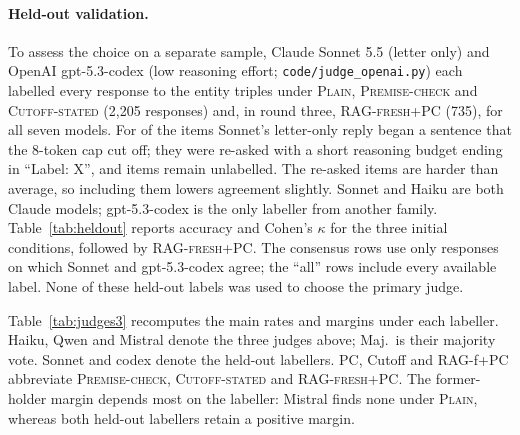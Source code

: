\paragraph{Held-out validation.}
To assess the choice on a separate sample, Claude Sonnet 5.5 (letter only) and OpenAI gpt-5.3-codex (low reasoning effort; \texttt{code/judge\_openai.py}) each labelled every response to the entity triples under \textsc{Plain}, \textsc{Premise-check} and \textsc{Cutoff-stated} (2{,}205 responses) and, in round three, \textsc{RAG-fresh+PC} (735), for all seven models. For \WSilRetry{} of the \WHoKeys{} items Sonnet's letter-only reply began a sentence that the 8-token cap cut off; they were re-asked with a short reasoning budget ending in ``Label: X'', and \WSilMissing{} items remain unlabelled. The re-asked items are harder than average, so including them lowers agreement slightly. Sonnet and Haiku are both Claude models; gpt-5.3-codex is the only labeller from another family. Table~\ref{tab:heldout} reports accuracy and Cohen's $\kappa$ for the three initial conditions, followed by \textsc{RAG-fresh+PC}. The consensus rows use only responses on which Sonnet and gpt-5.3-codex agree; the ``all'' rows include every available label. None of these held-out labels was used to choose the primary judge.

Table~\ref{tab:judges3} recomputes the main rates and margins under each labeller. Haiku, Qwen and Mistral denote the three judges above; Maj.\ is their majority vote. Sonnet and codex denote the held-out labellers. PC, Cutoff and RAG-f+PC abbreviate \textsc{Premise-check}, \textsc{Cutoff-stated} and \textsc{RAG-fresh+PC}. The former-holder margin depends most on the labeller: Mistral finds none under \textsc{Plain}, whereas both held-out labellers retain a positive margin.




